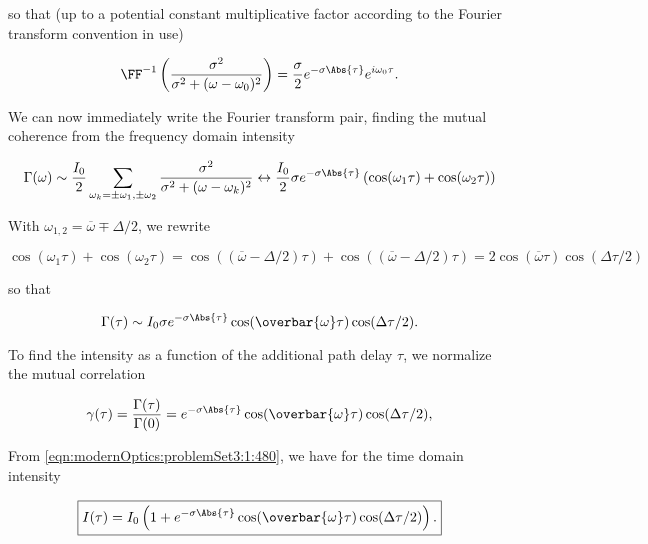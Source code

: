 {so that (up to a potential constant multiplicative factor according to the Fourier transform convention in use)

\begin{dmath}\label{eqn:modernOptics:problemSet3:1:360}
\FF^{-1} 
\left(
\frac{\sigma^2}
{
\sigma^2 + (\omega - \omega_0)^2
}
\right)
= 
\frac{\sigma}{2} e^{-\sigma \Abs{\tau}} e^{i \omega_0 \tau}.
\end{dmath}

We can now immediately write the Fourier transform pair, finding the mutual coherence from the frequency domain intensity

\begin{dmath}\label{eqn:modernOptics:problemSet3:1:380}
\Gamma(\omega) \sim \frac{I_0}{2} \sum_{\omega_k = \pm \omega_1, \pm \omega_2} 
\frac{\sigma^2}{\sigma^2 + (\omega - \omega_k)^2}
\leftrightarrow
\frac{I_0}{2}
\sigma e^{-\sigma \Abs{\tau}} \left(
\cos(\omega_1 \tau)
+\cos(\omega_2 \tau)
\right)
\end{dmath}

With $\omega_{1,2} = \overbar{\omega} \mp \Delta/2$, we rewrite

\begin{dmath}\label{eqn:modernOptics:problemSet3:1:400}
\cos(\omega_1 \tau) +\cos(\omega_2 \tau)
=
\cos\left( 
\left(
\overbar{\omega} - \Delta/2 
\right) \tau 
\right)
+
\cos\left( 
\left(
\overbar{\omega} - \Delta/2 
\right) \tau 
\right)
= 2 \cos( \overbar{\omega} \tau ) \cos ( \Delta \tau/2 )
\end{dmath}

so that

\begin{dmath}\label{eqn:modernOptics:problemSet3:1:420}
\Gamma(\tau) \sim
I_0
\sigma e^{-\sigma \Abs{\tau}} 
\cos( \overbar{\omega} \tau ) \cos ( \Delta \tau /2 ).
\end{dmath}

To find the intensity as a function of the additional path delay $\tau$, we normalize the mutual correlation

\begin{dmath}\label{eqn:modernOptics:problemSet3:1:440}
\gamma(\tau) 
= \frac{\Gamma(\tau)}{\Gamma(0)}
=
e^{-\sigma \Abs{\tau}} 
\cos( \overbar{\omega} \tau ) \cos ( \Delta \tau /2 ),
\end{dmath}

From \ref{eqn:modernOptics:problemSet3:1:480}, we have for the time domain intensity 

\begin{dmath}\label{eqn:modernOptics:problemSet3:1:460}
\boxed{
I(\tau) = I_0 
\left( 1 + 
e^{-\sigma \Abs{\tau}} 
\cos( \overbar{\omega} \tau ) \cos ( \Delta \tau /2 )
\right).
}
\end{dmath}

}
